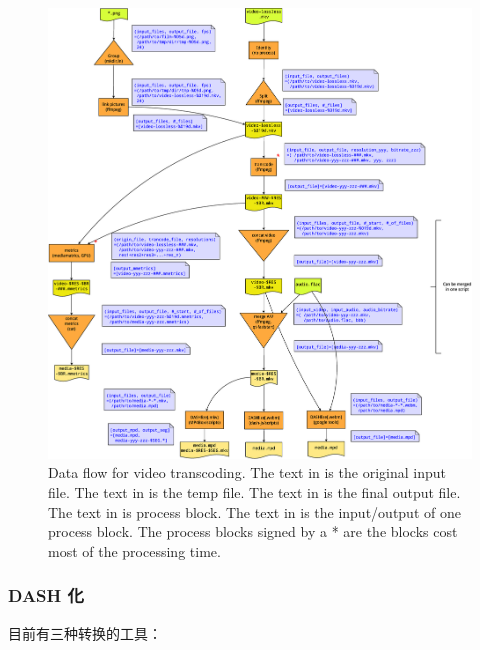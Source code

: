 \begin{figure}\centering
  \includegraphics[width=1.1\textwidth]{figures-appconv2dash/flowchart-1-transcode.eps}
  \caption{Data flow for video transcoding.
    The text in  is the original input file.
    The text in  is the temp file.
    The text in  is the final output file.
    The text in  is process block.
    The text in  is the input/output of one process block.
The process blocks signed by a \textcolor[HTML]{FF0000}{*} are the blocks cost most of the processing time.
  }\label{fig:vidtranscode}
\end{figure}



\subsubsection{DASH 化}
目前有三种转换的工具：

